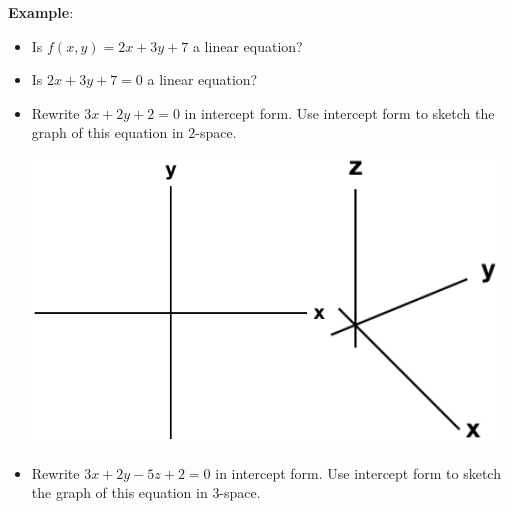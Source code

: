\documentclass[12pt,letterpaper,noanswers]{exam}
\begin{document}
\eject
\noindent\textbf{Example}:
\begin{itemize}
    \item Is $f(x,y) = 2x + 3y + 7$ a linear equation?
    \vspace{0.6cm}
    
    \item Is $2x+3y+7 = 0$ a linear equation?
    \vspace{0.6cm}

\item Rewrite $3x+2y +2 = 0$ in intercept form.  Use intercept form to sketch the graph of this equation in $2$-space.

\hfill\includegraphics[height=3in]{img/C02axes-2.png}\hfill\includegraphics[height=3in]{img/C02axes.png}\hfill

\item Rewrite $3x+2y-5z +2 = 0$ in intercept form.  Use intercept form to sketch the graph of this equation in $3$-space.
\vspace{1cm}

\end{itemize}
\end{document}
